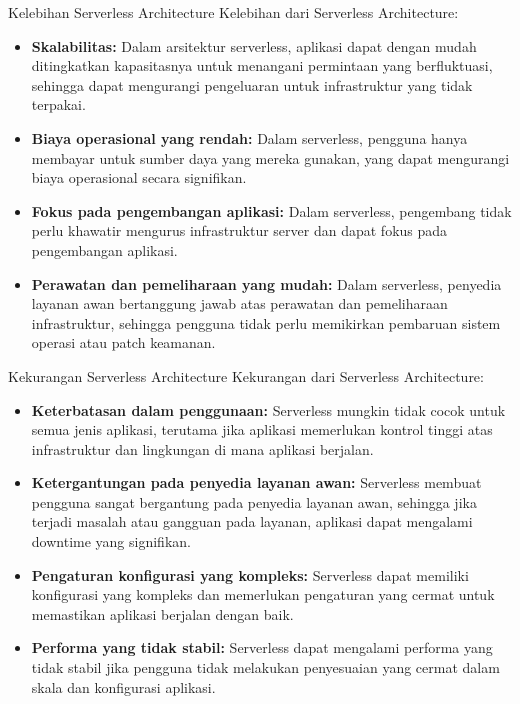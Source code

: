 \documentclass{beamer}
\begin{document}
    \begin{frame}{Kelebihan Serverless Architecture}
        Kelebihan dari Serverless Architecture:
        \begin{itemize}
            \item \textbf{Skalabilitas:} Dalam arsitektur serverless, aplikasi dapat dengan mudah ditingkatkan kapasitasnya untuk menangani permintaan yang berfluktuasi, sehingga dapat mengurangi pengeluaran untuk infrastruktur yang tidak terpakai.
	        \item \textbf{Biaya operasional yang rendah:} Dalam serverless, pengguna hanya membayar untuk sumber daya yang mereka gunakan, yang dapat mengurangi biaya operasional secara signifikan.
	        \item \textbf{Fokus pada pengembangan aplikasi:} Dalam serverless, pengembang tidak perlu khawatir mengurus infrastruktur server dan dapat fokus pada pengembangan aplikasi.
	        \item \textbf{Perawatan dan pemeliharaan yang mudah:} Dalam serverless, penyedia layanan awan bertanggung jawab atas perawatan dan pemeliharaan infrastruktur, sehingga pengguna tidak perlu memikirkan pembaruan sistem operasi atau patch keamanan.
        \end{itemize}
    \end{frame}

    \begin{frame}{Kekurangan Serverless Architecture}
        Kekurangan dari Serverless Architecture:
        \begin{itemize}
            \item \textbf{Keterbatasan dalam penggunaan:} Serverless mungkin tidak cocok untuk semua jenis aplikasi, terutama jika aplikasi memerlukan kontrol tinggi atas infrastruktur dan lingkungan di mana aplikasi berjalan.
	        \item \textbf{Ketergantungan pada penyedia layanan awan:} Serverless membuat pengguna sangat bergantung pada penyedia layanan awan, sehingga jika terjadi masalah atau gangguan pada layanan, aplikasi dapat mengalami downtime yang signifikan.
	        \item \textbf{Pengaturan konfigurasi yang kompleks:} Serverless dapat memiliki konfigurasi yang kompleks dan memerlukan pengaturan yang cermat untuk memastikan aplikasi berjalan dengan baik.
	        \item \textbf{Performa yang tidak stabil:} Serverless dapat mengalami performa yang tidak stabil jika pengguna tidak melakukan penyesuaian yang cermat dalam skala dan konfigurasi aplikasi.
        \end{itemize}
    \end{frame}
\end{document}
